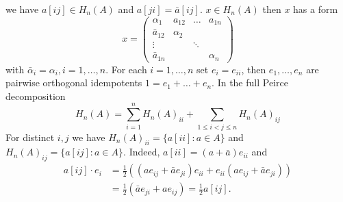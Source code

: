 \documentclass{article}
\begin{document}
we have $a[ij] \in H_n(A)$ and $a[ji] = \bar{a}[ij]$. $x \in H_n(A)$ then $x$ has a form  
\[  
x =   
\begin{pmatrix}  
\alpha_1 & a_{12} & \dots & a_{1n} \\
\bar{a}_{12} & \alpha_2 & & \\
\vdots & & \ddots & \\
\bar{a}_{1n} & & & \alpha_n  
\end{pmatrix}  
\]  
with $\bar{\alpha}_i = \alpha_i, i=1,\dots,n$. For each $i=1,\dots,n$ set $e_i=e_{ii}$, then $e_1, \dots, e_n$ are pairwise orthogonal idempotents $1=e_1+\dots+e_n$. In the full Peirce decomposition  
\[ H_n(A) = \sum_{i=1}^n H_n(A)_{ii} + \sum_{1 \le i < j \le n} H_n(A)_{ij} \]  
For distinct $i,j$ we have $H_n(A)_{ii} = \{a[ii] : a\in A \}$ and $H_n(A)_{ij} = \{a[ij] : a\in A \}$. Indeed, $a[ii] = (a+\bar{a})e_{ii}$ and  
\begin{align*}  
    a[ij] \cdot e_i &= \frac{1}{2}((ae_{ij}+\bar{a}e_{ji})e_{ii} + e_{ii}(ae_{ij}+\bar{a}e_{ji})) \\
    &= \frac{1}{2}(\bar{a}e_{ji}+ae_{ij}) = \frac{1}{2}a[ij].  
\end{align*} 
\end{document}
